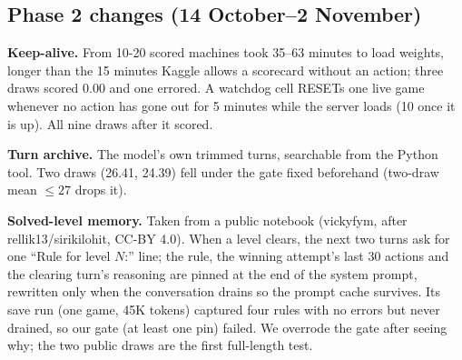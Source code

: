 \documentclass[11pt]{article}
\begin{document}
\subsection*{Phase 2 changes (14 October--2 November)}
\textbf{Keep-alive.} From 10-20 scored machines took 35--63 minutes to load weights, longer than the 15 minutes Kaggle
allows a scorecard without an action; three draws scored 0.00 and one errored. A watchdog cell RESETs one live game
whenever no action has gone out for 5 minutes while the server loads (10 once it is up). All nine draws after it scored.

\textbf{Turn archive.} The model's own trimmed turns, searchable from the Python tool. Two draws (26.41, 24.39) fell under
the gate fixed beforehand (two-draw mean $\le 27$ drops it).

\textbf{Solved-level memory.} Taken from a public notebook (vickyfym, after rellik13/sirikilohit, CC-BY 4.0). When a level clears, the next
two turns ask for one ``Rule for level $N$:'' line; the rule, the winning attempt's last 30 actions and the clearing turn's
reasoning are pinned at the end of the system prompt, rewritten only when the conversation drains so the prompt cache
survives. Its save run (one game, 45K tokens) captured four rules with no errors but never drained, so our gate
(at least one pin) failed. We overrode the gate after seeing why; the two public draws are the first full-length test.
\end{document}
